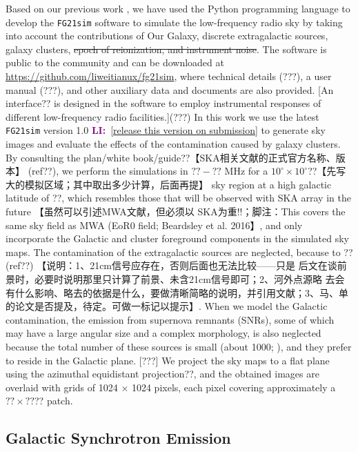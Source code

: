 \documentclass[modern]{aastex61}
\newcommand{\LI}[1]{\textcolor{purple}{\textbf{LI:}}~\uline{#1}}
\begin{document}
Based on our previous work \citep{wang2010}, we have used the Python
programming language to develop the \texttt{FG21sim} software to simulate
the low-frequency radio sky by taking into account the contributions of
Our Galaxy, discrete extragalactic sources, galaxy clusters,
\sout{epoch of reionization, and instrument noise}.
The software is public to the community and can be downloaded at
\url{https://github.com/liweitianux/fg21sim},
where technical details (???), a user manual (???), and other auxiliary
data and documents are also provided.
[An interface?? is designed in the software to employ instrumental
responses of different low-frequency radio facilities.](???)
In this work we use the latest \texttt{FG21sim} version 1.0
\LI{[release this version on submission]} to generate sky images and
evaluate the effects of the contamination caused by galaxy clusters.
By consulting the plan/white book/guide??【SKA相关文献的正式官方名称、版本】
(ref??), we perform the simulations in $?? - ??$ MHz for a
$10^{\circ} \times 10^{\circ}$??【先写大的模拟区域；其中取出多少计算，后面再提】
sky region at a high galactic latitude of ??, which resembles those that will
be observed with SKA array in the future 【虽然可以引述MWA文献，但必须以
SKA为重!!；脚注：This covers the same sky field as MWA (EoR0 field;
Beardsley et al. 2016】, and only incorporate the Galactic and cluster
foreground components in the simulated sky maps.
The contamination of the extragalactic sources are neglected,
because to ?? (ref??) 【说明：1、21cm信号应存在，否则后面也无法比较——只是
后文在谈前景时，必要时说明那里只计算了前景、未含21cm信号即可；2、河外点源略
去会有什么影响、略去的依据是什么，要做清晰简略的说明，并引用文献；3、马、单
的论文是否提及，待定。可做一标记以提示】.
When we model the Galactic contamination, the emission from supernova
remnants (SNRs), some of which may have a large angular size and a
complex morphology, is also neglected because the total number of these
sources is small (about 1000; \citealt{li1991,anderson2017}), and they
prefer to reside in the Galactic plane.
[???] We project the sky maps to a flat plane using the azimuthal equidistant
projection??, and the obtained images are overlaid with grids of 1024 ×
1024 pixels, each pixel covering approximately a $?? \times ??$?? patch.


\subsection{Galactic Synchrotron Emission}
\label{sec:fg-gsync}
\end{document}
